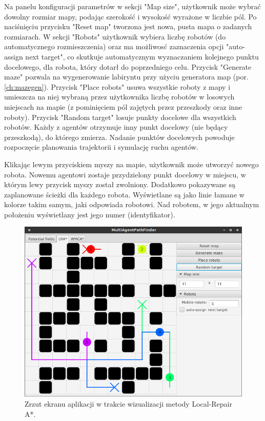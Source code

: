 Na panelu konfiguracji parametrów w sekcji "Map size", użytkownik może wybrać dowolny rozmiar mapy, podając szerokość i wysokość wyrażone w liczbie pól.
Po naciśnięciu przycisku "Reset map" tworzona jest nowa, pusta mapa o zadanych rozmiarach.
W sekcji "Robots" użytkownik wybiera liczbę robotów (do automatycznego rozmieszczenia) oraz ma możliwosć zaznaczenia opcji "auto-assign next target", co skutkuje automatycznym wyznaczaniem kolejnego punktu docelowego, dla robota, który dotarł do poprzedniego celu.
Przycisk "Generate maze" pozwala na wygenerowanie labiryntu przy użyciu generatora map (por. \ref{ch:mazegen}).
Przycisk "Place robots" usuwa wszystkie roboty z mapy i umieszcza na niej wybraną przez użytkownika liczbę robotów w losowych miejscach na mapie (z pominięciem pól zajętych przez przeszkody oraz inne roboty).
Przycisk "Random target" losuje punkty docelowe dla wszystkich robotów. Każdy z agentów otrzymuje inny punkt docelowy (nie będący przeszkodą), do którego zmierza. Nadanie punktów docelowych powoduje rozpoczęcie planowania trajektorii i symulację ruchu agentów.

Klikając lewym przyciskiem myszy na mapie, użytkownik może utworzyć nowego robota. Nowemu agentowi zostaje przydzielony punkt docelowy w miejscu, w którym lewy przycisk myszy został zwolniony.
Dodatkowo pokazywane są zaplanowane ścieżki dla każdego robota. Wyświetlane są jako linie łamane w kolorze takim samym, jaki odpowiada robotowi.
Nad robotem, w jego aktualnym położeniu wyświetlany jest jego numer (identyfikator).

\begin{figure}
	\centering
	\includegraphics[width=0.8\columnwidth]{img/robopath/ui-lra}
	\caption{Zrzut ekranu aplikacji w trakcie wizualizacji metody Local-Repair A*.}
	\label{fig:robopath-ui-lra}
\end{figure}


